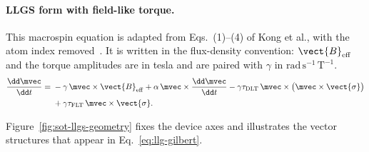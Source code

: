 \paragraph{LLGS form with field-like torque.}
This macrospin equation is adapted from Eqs.~(1)--(4) of Kong et al., with the
atom index removed~\cite{kong2026spatially}.  It is written in the
flux-density convention: $\vect{B}_{\mathrm{eff}}$ and the torque amplitudes
are in tesla and are paired with $\gamma$ in
$\mathrm{rad\,s^{-1}\,T^{-1}}$.
\begin{align}
    \frac{\dd\mvec}{\dd t}
    ={}& -\gamma\,\mvec\times\vect{B}_{\mathrm{eff}}
         + \alpha\,\mvec\times\frac{\dd\mvec}{\dd t}
         - \gamma\tau_{\mathrm{DLT}}\,
           \mvec\times\bigl(\mvec\times\vect{\sigma}\bigr)
         \notag\\
       & + \gamma\tau_{\mathrm{FLT}}\,
           \mvec\times\vect{\sigma}.
    \label{eq:llg-gilbert}
\end{align}

Figure~\ref{fig:sot-llgs-geometry} fixes the device axes and illustrates the
vector structures that appear in Eq.~\eqref{eq:llg-gilbert}.


